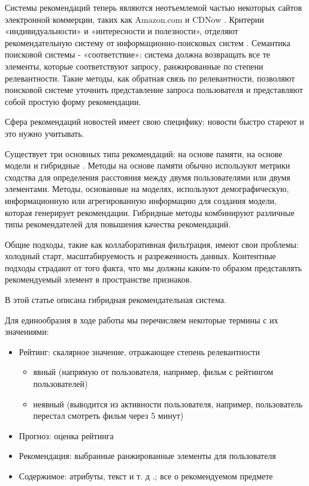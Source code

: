 \documentclass[14pt]{matmex-diploma-custom}
\begin{document}
    Системы рекомендаций теперь являются неотъемлемой частью некоторых сайтов электронной коммерции, таких как Amazon.com и CDNow \citep{commerce}. Критерии «индивидуальности» и «интересности и полезности», отделяют рекомендательную систему от информационно-поисковых систем \citep{coin}. Семантика поисковой системы - «соответствие»: система должна возвращать все те элементы, которые соответствуют запросу, ранжированные по степени релевантности. Такие методы, как обратная связь по релевантности, позволяют поисковой системе уточнить представление запроса пользователя и представляют собой простую форму рекомендации.

    Сфера рекомендаций новостей имеет свою специфику: новости быстро стареют и это нужно учитывать.

     Существует три основных типа рекомендаций: на основе памяти, на основе модели и гибридные \citep{survey}. Методы на основе памяти \citep{memory} обычно используют метрики сходства для определения расстояния между двумя пользователями или двумя элементами. Методы, основанные на моделях, используют демографическую, информационную или агрегированную информацию для создания модели, которая генерирует рекомендации. Гибридные методы \citep{combining} комбинируют различные типы рекомендателей для повышения качества рекомендаций.

    Общие подходы, такие как коллаборативная фильтрация, имеют свои проблемы: холодный старт, масштабируемость и разреженность данных. Контентные подходы страдают от того факта, что мы должны каким-то образом представлять рекомендуемый элемент в пространстве признаков.

    В этой статье описана гибридная рекомендательная система.
    
    Для единообразия в ходе работы мы перечисляем некоторые термины с их значениями:

        \begin{itemize}
            \item Рейтинг: скалярное значение, отражающее степень релевантности
                \begin {itemize}
                    \item явный (напрямую от пользователя, например, фильм с рейтингом пользователей)
                    \item неявный (выводится из активности пользователя, например, пользователь перестал смотреть фильм через 5 минут)
                \end {itemize}
            \item Прогноз: оценка рейтинга
            \item Рекомендация: выбранные ранжированные элементы для пользователя
            \item Содержимое: атрибуты, текст и т. д .; все о рекомендуемом предмете
        \end {itemize}
\end{document}
